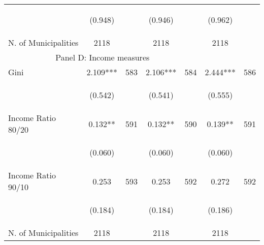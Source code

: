 \begin{tabular}{lcccccc}
\vspace{4pt} &  \begin{footnotesize}(0.948)\end{footnotesize}   & &
			    \begin{footnotesize}(0.946)\end{footnotesize}   & &
			    \begin{footnotesize}(0.962)\end{footnotesize}   &
			     \\

N. of Municipalities   &   2118   & &    2118 &    &  2118  &   \\
\hline	

\multicolumn{5}{c}{Panel D: Income measures} \\

Gini    &  2.109***   &  583  &   2.106***  &  584 &  2.444***  &  586   \\

\vspace{4pt} &  \begin{footnotesize}(0.542)\end{footnotesize}   & &
			    \begin{footnotesize}(0.541)\end{footnotesize}   & &
			    \begin{footnotesize}(0.555)\end{footnotesize}   &
			     \\          


Income Ratio 80/20     &  0.132**   &  591  &   0.132**  &  590 &  0.139**  &  591   \\

\vspace{4pt} &  \begin{footnotesize}(0.060)\end{footnotesize}   & &
			    \begin{footnotesize}(0.060)\end{footnotesize}   & &
			    \begin{footnotesize}(0.060)\end{footnotesize}   &
			     \\


Income Ratio 90/10     &  0.253   &  593  &   0.253  &  592 &  0.272  &  592   \\

\vspace{4pt} &  \begin{footnotesize}(0.184)\end{footnotesize}   & &
			    \begin{footnotesize}(0.184)\end{footnotesize}   & &
			    \begin{footnotesize}(0.186)\end{footnotesize}   &
			     \\


N. of Municipalities   &   2118   & &    2118 &    &  2118  &   \\
\hline	


\end{tabular}%
